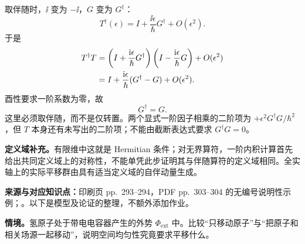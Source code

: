 \begin{checkedsolution}
取伴随时，$\ii$ 变为 $-\ii$，$G$ 变为 $G^\dagger$：
\begin{equation}
  T^\dagger(\epsilon)
     =I+\frac{\ii\epsilon}{\hbar}G^\dagger+O(\epsilon^2).
\end{equation}
于是
\begin{align}
  T^\dagger T
    &=\left(I+\frac{\mathrm{i}\epsilon}{\hbar}G^\dagger\right)
      \left(I-\frac{\mathrm{i}\epsilon}{\hbar}G\right)
       +O(\epsilon^2)\notag\\
    &=I+\frac{\mathrm{i}\epsilon}{\hbar}(G^\dagger-G)
       +O(\epsilon^2).
\end{align}
酉性要求一阶系数为零，故
\begin{equation}
  \boxed{G^\dagger=G}.
\end{equation}
这里必须取伴随，而不是仅转置。两个显式一阶因子相乘的二阶项为 $+\epsilon^2G^\dagger G/\hbar^2$，但 $T$ 本身还有未写出的二阶项；不能由截断表达式要求 $G^\dagger G=0$。

\textbf{定义域补充。}有限维中这就是 Hermitian 条件；对无界算符，一阶内积计算首先给出共同定义域上的对称性，不能单凭此步证明其与伴随算符的定义域相同。全实轴上的实际平移群由具有适当定义域的自伴动量生成。
\end{checkedsolution}

\textbf{来源与对应知识点：}印刷页 pp.~293--294，PDF pp.~303--304 的无编号说明性示例；。以下是模型及论证的整理，不额外添加作业。

\textbf{情境。}氢原子处于带电电容器产生的外势 $\Phi_{\mathrm{ext}}$ 中。比较“只移动原子”与“把原子和相关场源一起移动”，说明空间均匀性究竟要求平移什么。

